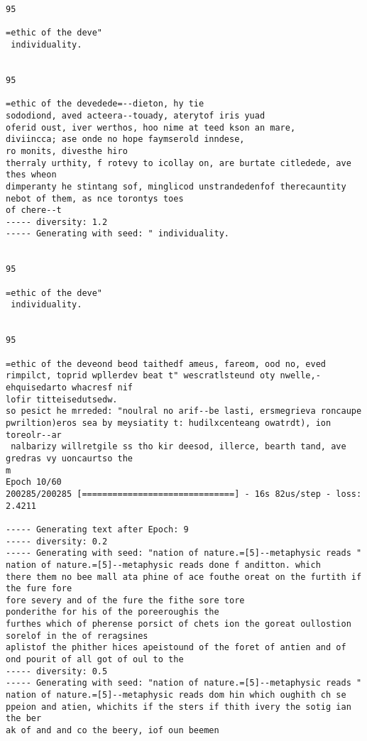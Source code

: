 \documentclass[11pt]{article}
\begin{document}
\begin{Verbatim}[commandchars=\\\{\}]
95

=ethic of the deve"
 individuality.


95

=ethic of the devedede=--dieton, hy tie
sododiond, aved acteera--touady, aterytof iris yuad
oferid oust, iver werthos, hoo nime at teed kson an mare,
diviincca; ase onde no hope faymserold inndese,
ro monits, divesthe hiro
therraly urthity, f rotevy to icollay on, are burtate citledede, ave thes wheon
dimperanty he stintang sof, minglicod unstrandedenfof therecauntity nebot of them, as nce torontys toes
of chere--t
----- diversity: 1.2
----- Generating with seed: " individuality.


95

=ethic of the deve"
 individuality.


95

=ethic of the deveond beod taithedf ameus, fareom, ood no, eved rimpilct, toprid wpllerdev beat t" wescratlsteund oty nwelle,-ehquisedarto whacresf nif
lofir titteisedutsedw.
so pesict he mrreded: "noulral no arif--be lasti, ersmegrieva roncaupe pwriltion)eros sea by meysiatity t: hudilxcenteang owatrdt), ion toreolr--ar
 nalbarizy willretgile ss tho kir deesod, illerce, bearth tand, ave gredras vy uoncaurtso the
m
Epoch 10/60
200285/200285 [==============================] - 16s 82us/step - loss: 2.4211

----- Generating text after Epoch: 9
----- diversity: 0.2
----- Generating with seed: "nation of nature.=[5]--metaphysic reads "
nation of nature.=[5]--metaphysic reads done f anditton. which
there them no bee mall ata phine of ace fouthe oreat on the furtith if the fure fore
fore severy and of the fure the fithe sore tore
ponderithe for his of the poreeroughis the
furthes which of pherense porsict of chets ion the goreat oullostion sorelof in the of reragsines
aplistof the phither hices apeistound of the foret of antien and of ond pourit of all got of oul to the
----- diversity: 0.5
----- Generating with seed: "nation of nature.=[5]--metaphysic reads "
nation of nature.=[5]--metaphysic reads dom hin which oughith ch se ppeion and atien, whichits if the sters if thith ivery the sotig ian the ber
ak of and and co the beery, iof oun beemen


\end{Verbatim}
\end{document}
